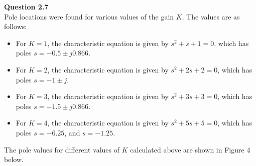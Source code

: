 \documentclass{article}
\begin{document}
	\textbf{Question 2.7}\\
	
	Pole locations were found for various values of the gain $K$. The values are as follows:
	\begin{itemize}
		\item For $K = 1$, the characteristic equation is given by $s^2 + s + 1 = 0$, which has poles $s = -0.5 \pm j0.866$.
		\item For $K = 2$, the characteristic equation is given by $s^2 + 2s + 2 = 0$, which has poles $s = -1 \pm j$.
		\item For $K = 3$, the characteristic equation is given by $s^2 + 3s + 3 = 0$, which has poles $s = -1.5 \pm j0.866$.
		\item For $K = 4$, the characteristic equation is given by $s^2 + 5s + 5 = 0$, which has poles $s = -6.25$, and $s = -1.25$.
	\end{itemize}
	
	The pole values for different values of $K$ calculated above are shown in Figure 4 below.\\
	
\end{document}
